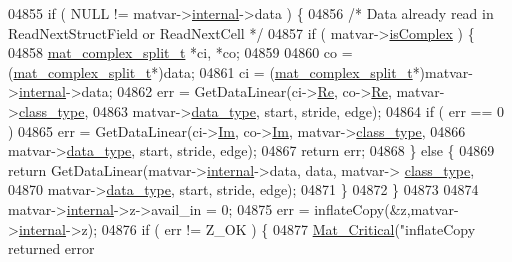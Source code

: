 \begin{DoxyCode}
{{{{{{{{{{{{{{{{{{{{{{{{{{{{04855         \textcolor{keywordflow}{if} ( NULL != matvar->\hyperlink{group___m_a_t_a6e97e3ed9f40c49322c18561c2a94e92}{internal}->data ) \{
04856             \textcolor{comment}{/* Data already read in ReadNextStructField or ReadNextCell */}
04857             \textcolor{keywordflow}{if} ( matvar->\hyperlink{group___m_a_t_aeb03b3a69f108dc05470b00443a43739}{isComplex} ) \{
04858                 \hyperlink{group___m_a_t_structmat__complex__split__t}{mat\_complex\_split\_t} *ci, *co;
04859 
04860                 co = (\hyperlink{group___m_a_t_structmat__complex__split__t}{mat\_complex\_split\_t}*)data;
04861                 ci = (\hyperlink{group___m_a_t_structmat__complex__split__t}{mat\_complex\_split\_t}*)matvar->\hyperlink{group___m_a_t_a6e97e3ed9f40c49322c18561c2a94e92}{internal}->data;
04862                 err = GetDataLinear(ci->\hyperlink{group___m_a_t_a484a93607508adac2bce53a0252e0325}{Re}, co->\hyperlink{group___m_a_t_a484a93607508adac2bce53a0252e0325}{Re}, matvar->\hyperlink{group___m_a_t_aff13035bf3265dd7d9425e5d40c839d4}{class\_type},
04863                     matvar->\hyperlink{group___m_a_t_ab6aafe9bd77f0f077852593dec438144}{data\_type}, start, stride, edge);
04864                 \textcolor{keywordflow}{if} ( err == 0 )
04865                     err = GetDataLinear(ci->\hyperlink{group___m_a_t_a7182d10b0d3598415887376065440946}{Im}, co->\hyperlink{group___m_a_t_a7182d10b0d3598415887376065440946}{Im}, matvar->\hyperlink{group___m_a_t_aff13035bf3265dd7d9425e5d40c839d4}{class\_type},
04866                         matvar->\hyperlink{group___m_a_t_ab6aafe9bd77f0f077852593dec438144}{data\_type}, start, stride, edge);
04867                 \textcolor{keywordflow}{return} err;
04868             \} \textcolor{keywordflow}{else} \{
04869                 \textcolor{keywordflow}{return} GetDataLinear(matvar->\hyperlink{group___m_a_t_a6e97e3ed9f40c49322c18561c2a94e92}{internal}->data, data, matvar->
      \hyperlink{group___m_a_t_aff13035bf3265dd7d9425e5d40c839d4}{class\_type},
04870                     matvar->\hyperlink{group___m_a_t_ab6aafe9bd77f0f077852593dec438144}{data\_type}, start, stride, edge);
04871             \}
04872         \}
04873 
04874         matvar->\hyperlink{group___m_a_t_a6e97e3ed9f40c49322c18561c2a94e92}{internal}->z->avail\_in = 0;
04875         err = inflateCopy(&z,matvar->\hyperlink{group___m_a_t_a6e97e3ed9f40c49322c18561c2a94e92}{internal}->z);
04876         \textcolor{keywordflow}{if} ( err != Z\_OK ) \{
04877             \hyperlink{group__mat__util_gaf51f2bfbb5580f575e4dd79757e2b80c}{Mat\_Critical}(\textcolor{stringliteral}{"inflateCopy returned error %
}}}}}}}}}}}}}}}}}}}}}}}}}}}}}
\end{DoxyCode}

